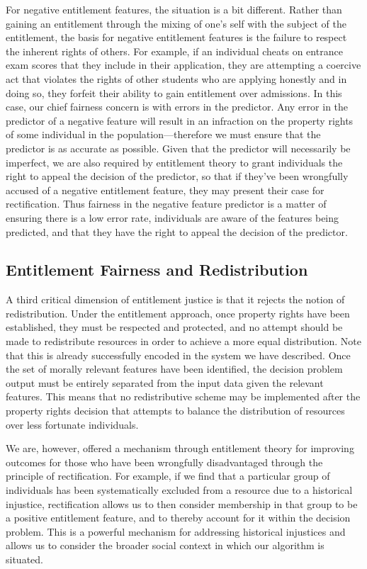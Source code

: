 For negative entitlement features, the situation is a bit different. Rather than
gaining an entitlement through the mixing of one's self with the subject of the
entitlement, the basis for negative entitlement features is the failure to
respect the inherent rights of others. For example, if an individual cheats on
entrance exam scores that they include in their application, they are attempting
a coercive act that violates the rights of other students who are applying
honestly and in doing so, they forfeit their ability to gain entitlement over
admissions. In this case, our chief fairness concern is with errors in the
predictor. Any error in the predictor of a negative feature will result in an
infraction on the property rights of some individual in the population—therefore
we must ensure that the predictor is as accurate as possible. Given that the
predictor will necessarily be imperfect, we are also required by entitlement
theory to grant individuals the right to appeal the decision of the predictor, so
that if they've been wrongfully accused of a negative entitlement feature, they
may present their case for rectification. Thus fairness in the negative feature
predictor is a matter of ensuring there is a low error rate, individuals are 
aware of the features being predicted, and that they have the right to appeal
the decision of the predictor.

\subsection{Entitlement Fairness and Redistribution}

A third critical dimension of entitlement justice is that it rejects the notion
of redistribution. Under the entitlement approach, once property rights have
been established, they must be respected and protected, and no attempt should be
made to redistribute resources in order to achieve a more equal distribution.
Note that this is already successfully encoded in the system we have described.
Once the set of morally relevant features have been identified, the decision
problem output must be entirely separated from the input data given the relevant
features. This means that no redistributive scheme may be implemented after the
property rights decision that attempts to balance the distribution of resources
over less fortunate individuals.

We are, however, offered a mechanism through entitlement theory for improving
outcomes for those who have been wrongfully disadvantaged through the principle
of rectification. For example, if we find that a particular group of individuals
has been systematically excluded from a resource due to a historical injustice,
rectification allows us to then consider membership in that group to be a
positive entitlement feature, and to thereby account for it within the decision
problem. This is a powerful mechanism for addressing historical injustices
and allows us to consider the broader social context in which our algorithm is
situated. 

